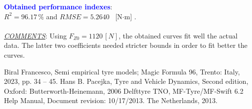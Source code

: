 \documentclass{IEEEtran}
\begin{document}
            \textbf{\textcolor{blue}{Obtained performance indexes}}: \\ $R^{2} = 96.17 \, \%$ and $RMSE = 5.2640 $ \, [N$\cdot$m] . \\\\

            \textit{\underline{COMMENTS}}: Using $F_{Z0} = 1120\,[N]$, the obtained curves fit well the actual data. The latter two coefficients needed stricter bounds in order to fit better the curves.

        \newpage
        
    \begin{thebibliography}{00}
         Biral Francesco, Semi empirical tyre models; Magic Formula 96, Trento: Italy, 2023, pp. 34 -- 45.
         Hans B. Pacejka, Tyre and Vehicle Dynamics, Second edition, Oxford: Butterworth-Heinemann, 2006
         Delfttyre TNO, MF-Tyre/MF-Swift 6.2
        Help Manual, Document revision: 10/17/2013. The Netherlands, 2013. \\\\
        
    \end{thebibliography}
\end{document}
